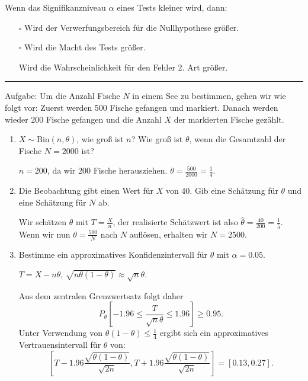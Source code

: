 Wenn das Signifikanzniveau $\alpha$ eines Tests kleiner wird, dann:
\begin{itemize}
    \item[$\square$] Wird der Verwerfungsbereich für die Nullhypothese größer.
    \item[$\square$] Wird die Macht des Tests größer.
    \item[\checkmark] Wird die Wahrscheinlichkeit für den Fehler 2. Art größer.
\end{itemize}
\rule{\linewidth}{0.4pt}
Aufgabe: Um die Anzahl Fische $N$ in einem See zu bestimmen, gehen wir
wie folgt vor: Zuerst werden 500 Fische gefangen und markiert. Danach
werden wieder 200 Fische gefangen und die Anzahl $X$ der markierten
Fische gezählt.

\begin{enumerate}
    \item $X \sim \text{Bin}(n, \theta)$, wie groß ist $n$? Wie groß ist $\theta$, wenn die Gesamtzahl
    der Fische $N = 2000$ ist?
    
    $n = 200$, da wir 200 Fische herausziehen. $\theta = \frac{500}{2000} = \frac{1}{4}$.
    
    \item Die Beobachtung gibt einen Wert für $X$ von 40. Gib eine Schätzung
    für $\theta$ und eine Schätzung für $N$ ab.
    
    Wir schätzen $\theta$ mit $T = \frac{X}{n}$, der realisierte Schätzwert ist also $\hat{\theta} = \frac{40}{200} = \frac{1}{5}$. Wenn wir nun $\theta = \frac{500}{N}$ nach $N$ auflösen, erhalten wir $N = 2500$.
    
    \item Bestimme ein approximatives Konfidenzintervall für $\theta$ mit $\alpha = 0.05$.
    
    $T = X - n\theta$, $\sqrt{n\theta(1-\theta)} \approx \sqrt{n}\theta$.
    
    Aus dem zentralen Grenzwertsatz folgt daher
    \[
    P_{\theta}\left[-1.96 \leq \frac{T}{\sqrt{n}\theta} \leq 1.96\right] \geq 0.95.
    \]
    Unter Verwendung von $\theta(1 - \theta) \leq \frac{1}{4}$ ergibt sich ein approximatives Vertrauensintervall für $\theta$ von:
    \[
    \left[T - 1.96 \frac{\sqrt{\theta(1-\theta)}}{\sqrt{2n}}, T + 1.96 \frac{\sqrt{\theta(1-\theta)}}{\sqrt{2n}}\right] = [0.13, 0.27].
    \]
\end{enumerate}